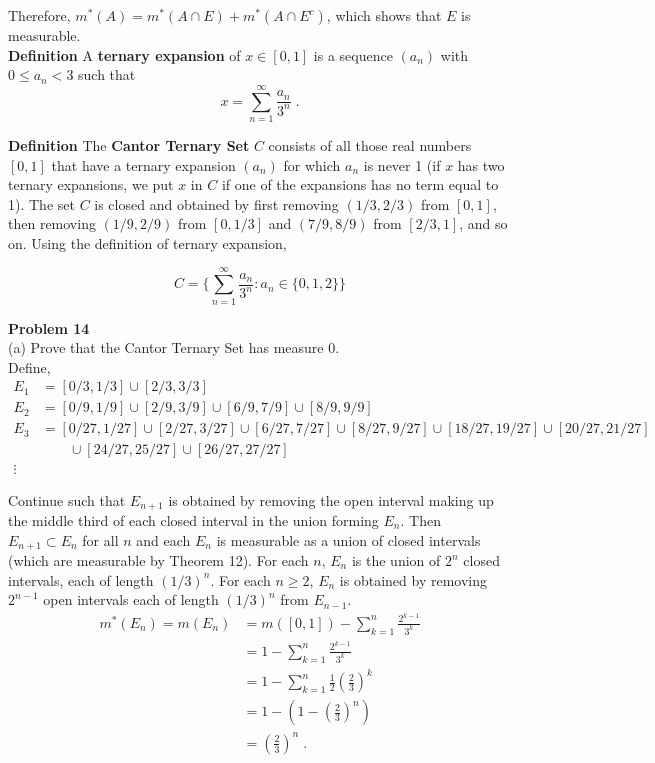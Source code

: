 \documentclass[a4paper]{article}
\begin{document}
Therefore, $m^*(A) = m^*(A \cap E) + m^*(A \cap E^c)$, which shows that $E$ is measurable. \\

{\bf Definition} A {\bf ternary expansion} of $x \in [0,1]$ is a sequence $(a_n)$ with $0\leq a_n < 3$ such that 
$$x = \sum_{n=1}^\infty \frac{a_n}{3^n} \;.$$

{\bf Definition} The {\bf Cantor Ternary Set} $C$ consists of all those real numbers $[0,1]$ that have a ternary expansion $(a_n)$ for which $a_n$ is never 1 (if $x$ has two ternary expansions, we put $x$ in $C$ if one of the expansions has no term equal to 1). The set $C$ is closed and obtained by first removing $(1/3, 2/3)$ from $[0,1]$, then removing $(1/9,2/9)$ from $[0,1/3]$ and $(7/9,8/9)$ from $[2/3,1]$, and so on. Using the definition of ternary expansion,

$$C =  \Bigg\{ \sum_{n=1}^\infty \frac{a_n}{3^n} : a_n \in \{0, 1, 2\} \Bigg\}$$

{\bf Problem 14}\\

(a) Prove that the Cantor Ternary Set has measure 0. \\

Define,
\begin{align*}
E_1 &= [0/3,1/3] \cup [2/3, 3/3]\\
E_2 &= [0/9,1/9]\cup[2/9,3/9]\cup [6/9,7/9]\cup[8/9,9/9]\\
E_3 &= [0/27,1/27]\cup [2/27,3/27] \cup [6/27, 7/27]\cup[8/27,9/27] \cup [18/27, 19/27]\cup [20/27,21/27]\\
&\quad \quad \cup [24/27,25/27]\cup [26/27, 27/27]\\
\vdots
\end{align*}

Continue such that $E_{n+1}$ is obtained by removing the open interval making up the middle third of each closed interval in the union forming $E_n$. Then $E_{n+1} \subset E_n$ for all $n$ and each $E_n$ is measurable as a union of closed intervals (which are measurable by Theorem 12). For each $n$, $E_n$ is the union of $2^n$ closed intervals, each of length $(1/3)^n$. For each $n \geq 2$, $E_n$ is obtained by removing $2^{n-1}$ open intervals each of length $(1/3)^n$ from $E_{n-1}$.
\begin{align*}
m^*(E_n) = m(E_n) &= m([0,1]) -\sum_{k=1}^n \frac{2^{k-1}}{3^k}\\
&= 1 -\sum_{k=1}^n \frac{2^{k-1}}{3^k}\\
&= 1- \sum_{k=1}^n \frac{1}{2}\left(\frac{2}{3}\right)^k \\
&= 1 - \left(1-\left(\frac{2}{3}\right)^n\right)\\
&= \left(\frac{2}{3}\right)^n \;.
\end{align*}
\end{document}
